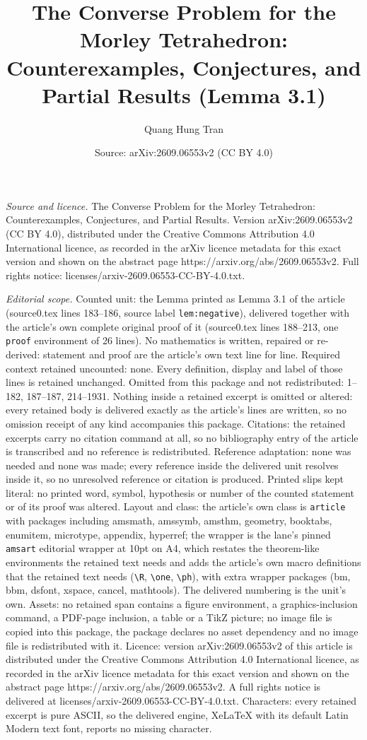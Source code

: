 \documentclass[10pt,a4paper]{amsart}
\title[The Converse Problem for the Morley Tetrahedron: Counterexam]{The Converse Problem for the Morley Tetrahedron: Counterexamples, Conjectures, and Partial Results (Lemma 3.1)}
\author{Quang Hung Tran}
\date{Source: arXiv:2609.06553v2 (CC BY 4.0)}
\begin{document}
\maketitle

\noindent\emph{Source and licence.} The Converse Problem for the Morley Tetrahedron: Counterexamples, Conjectures, and Partial Results. Version arXiv:2609.06553v2 (CC BY 4.0), distributed under the Creative Commons Attribution 4.0 International licence, as recorded in the arXiv licence metadata for this exact version and shown on the abstract page https://arxiv.org/abs/2609.06553v2. Full rights notice: licenses/arxiv-2609.06553-CC-BY-4.0.txt.\par\smallskip

\noindent\textit{Editorial scope.} Counted unit: the Lemma printed as Lemma 3.1 of the article (source0.tex lines 183--186, source label \texttt{lem:negative}), delivered together with the article's own complete original proof of it (source0.tex lines 188--213, one \texttt{proof} environment of 26 lines). No mathematics is written, repaired or re-derived: statement and proof are the article's own text line for line. Required context retained uncounted: none. Every definition, display and label of those lines is retained unchanged. Omitted from this package and not redistributed: 1--182, 187--187, 214--1931. Nothing inside a retained excerpt is omitted or altered: every retained body is delivered exactly as the article's lines are written, so no omission receipt of any kind accompanies this package. Citations: the retained excerpts carry no citation command at all, so no bibliography entry of the article is transcribed and no reference is redistributed. Reference adaptation: none was needed and none was made; every reference inside the delivered unit resolves inside it, so no unresolved reference or citation is produced. Printed slips kept literal: no printed word, symbol, hypothesis or number of the counted statement or of its proof was altered. Layout and class: the article's own class is \texttt{article} with packages including amsmath, amssymb, amsthm, geometry, booktabs, enumitem, microtype, appendix, hyperref; the wrapper is the lane's pinned \texttt{amsart} editorial wrapper at 10pt on A4, which restates the theorem-like environments the retained text needs and adds the article's own macro definitions that the retained text needs (\texttt{\textbackslash R}, \texttt{\textbackslash one}, \texttt{\textbackslash ph}), with extra wrapper packages (bm, bbm, dsfont, xspace, cancel, mathtools). The delivered numbering is the unit's own. Assets: no retained span contains a figure environment, a graphics-inclusion command, a PDF-page inclusion, a table or a TikZ picture; no image file is copied into this package, the package declares no asset dependency and no image file is redistributed with it. Licence: version arXiv:2609.06553v2 of this article is distributed under the Creative Commons Attribution 4.0 International licence, as recorded in the arXiv licence metadata for this exact version and shown on the abstract page https://arxiv.org/abs/2609.06553v2. A full rights notice is delivered at licenses/arxiv-2609.06553-CC-BY-4.0.txt. Characters: every retained excerpt is pure ASCII, so the delivered engine, XeLaTeX with its default Latin Modern text font, reports no missing character.
\end{document}

